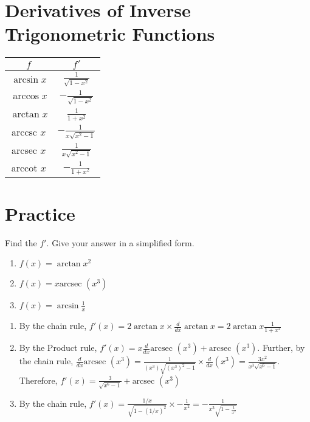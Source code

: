 \section{Derivatives of Inverse Trigonometric Functions}

\begin{center}
\begin{tabular}{ |c|c| }
	\hline
	$f$ & $f'$\\
	\hline
	$\arcsin{x}$ & $\frac{1}{\sqrt{1 - x^2}}$\\
	\hline
	$\arccos{x}$ & $ - \frac{1}{\sqrt{1 - x^2}}$\\
	\hline
	$\arctan{x}$ & $\frac{1}{1 + x^2}$\\
	\hline
	arccsc $x$ & $ - \frac{1}{x\sqrt{x^2-1}}$\\
	\hline
	arcsec $x$ & $\frac{1}{x\sqrt{x^2-1}}$\\
	\hline
	arccot $x$ & $ - \frac{1}{1+x^2}$\\
	\hline
\end{tabular}
\end{center}


\section{Practice}

\begin{Exercise}[label=invtrig1]
Find the $f'$. Give your answer in a simplified form. 
\begin{enumerate}
\item $f(x) = \arctan{x}^2$
\item $f(x) = x\text{arcsec }(x^3)$
\item $f(x) = \arcsin{\frac{1}{x}}$
\end{enumerate}
\end{Exercise}

\begin{Answer}[ref=invtrig1]
\begin{enumerate}
\item By the chain rule, $f'(x) = 2\arctan{x} \times \frac{d}{dx}\arctan{x} = 2\arctan{x}\frac{1}{1 + x^2}$
\item By the Product rule, $f'(x) = x \frac{d}{dx}\text{arcsec }(x^3) + \text{arcsec }(x^3)$. Further, by the chain rule, $\frac{d}{dx}\text{arcsec }(x^3) = \frac{1}{(x^3)\sqrt{(x^3)^2-1}} \times \frac{d}{dx}(x^3) = \frac{3x^2}{x^3\sqrt{x^6-1}}$. Therefore, $f'(x) = \frac{3}{\sqrt{x^6-1}} + \text{arcsec }(x^3)$
\item By the chain rule, $f'(x) = \frac{1/x}{\sqrt{1-(1/x)^2}} \times - \frac{1}{x^2} = - \frac{1}{x^3\sqrt{1-\frac{1}{x^2}}}$
\end{enumerate}
\end{Answer}